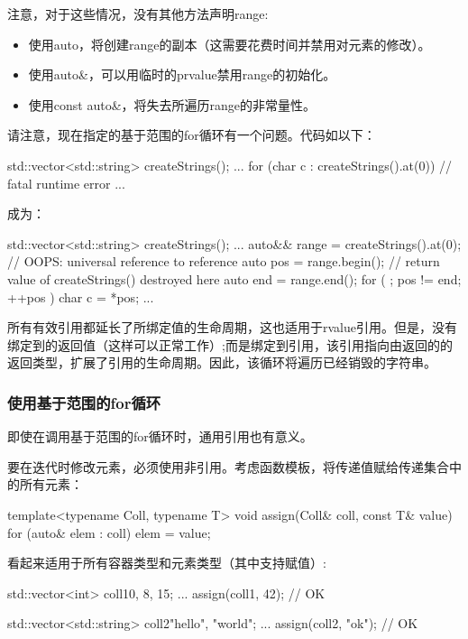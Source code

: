 注意，对于这些情况，没有其他方法声明range:

\begin{itemize}
	\item 使用auto，将创建range的副本（这需要花费时间并禁用对元素的修改）。
	\item 使用auto\&，可以用临时的prvalue禁用range的初始化。
	\item 使用const auto\&，将失去所遍历range的非常量性。
\end{itemize}

请注意，现在指定的基于范围的for循环有一个问题。代码如以下：

\begin{cppcode}
std::vector<std::string> createStrings();
...
for (char c : createStrings().at(0)) { // fatal runtime error
	...
}
\end{cppcode}

成为：

\begin{cppcode}
std::vector<std::string> createStrings();
...
auto&& range = createStrings().at(0); // OOPS: universal reference to reference
auto pos = range.begin(); // return value of createStrings() destroyed here
auto end = range.end();
for ( ; pos != end; ++pos ) {
	char c = *pos;
	...
}
\end{cppcode}

所有有效引用都延长了所绑定值的生命周期，这也适用于rvalue引用。但是，没有绑定到的返回值（这样可以正常工作）;而是绑定到引用，该引用指向由返回的的返回类型，扩展了引用的生命周期。因此，该循环将遍历已经销毁的字符串。

\subsubsection{使用基于范围的for循环}

即使在调用基于范围的for循环时，通用引用也有意义。

要在迭代时修改元素，必须使用非引用。考虑函数模板，将传递值赋给传递集合中的所有元素：

\begin{cppcode}
template<typename Coll, typename T>
void assign(Coll& coll, const T& value) {
	for (auto& elem : coll) {
		elem = value;
	}
}
\end{cppcode}

看起来适用于所有容器类型和元素类型（其中支持赋值）:

\begin{cppcode}
std::vector<int> coll1{0, 8, 15};
...
assign(coll1, 42); // OK

std::vector<std::string> coll2{"hello", "world"};
...
assign(coll2, "ok"); // OK
\end{cppcode}

